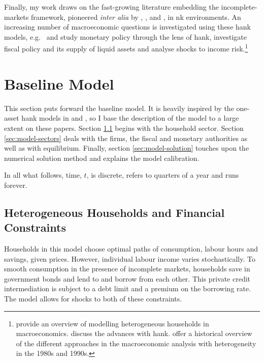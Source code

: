 \documentclass[a4paper,12pt]{article} %
\numberwithin{equation}{section} %
\numberwithin{figure}{section}
\numberwithin{table}{section}
\begin{document}
Finally, my work draws on the fast-growing literature embedding the incomplete-markets framework, pioneered \textit{inter alia} by \textcite{bewley1986}, \textcite{im1989}, \textcite{huggett1993} and \textcite{aiyagari1994}, in \Gls{nk} environments. An increasing number of macroeconomic questions is investigated using these \Gls{hank} models, e.g.~\textcite{mckay2016} and \textcite{kaplan2018} study monetary policy through the lens of \Gls{hank}, \textcite{bayer2023} investigate fiscal policy and its supply of liquid assets and \textcite{bayer2019} analyse shocks to income risk.\footnote{\textcite{heath2009} provide an overview of modelling heterogeneous households in macroeconomics. \textcite{kv2018} discuss the advances with \Gls{hank}. \textcite{cherrier2023} offer a historical overview of the different approaches in the macroeconomic analysis with heterogeneity in the 1980s and 1990s.}

\section{Baseline Model}
\label{sec:model}

This section puts forward the baseline model. It is heavily inspired by the one-asset \Gls{hank} models in \textcite{auclert2021} and \textcite{boehl2023econpizza}, so I base the description of the model to a large extent on these papers. Section \ref{sec:model-hh} begins with the household sector. Section \ref{sec:model-sectors} deals with the firms, the fiscal and monetary authorities as well as with equilibrium. Finally, section \ref{sec:model-solution} touches upon the numerical solution method and explains the model calibration. 

In all what follows, time, $t$, is discrete, refers to quarters of a year and runs forever.

\subsection{Heterogeneous Households and Financial Constraints}
\label{sec:model-hh}

Households in this model choose optimal paths of consumption, labour hours and savings, given prices. However, individual labour income varies stochastically. To smooth consumption in the presence of incomplete markets, households save in government bonds and lend to and borrow from each other. This private credit intermediation is subject to a debt limit and a premium on the borrowing rate. The model allows for shocks to both of these constraints.
\end{document}
